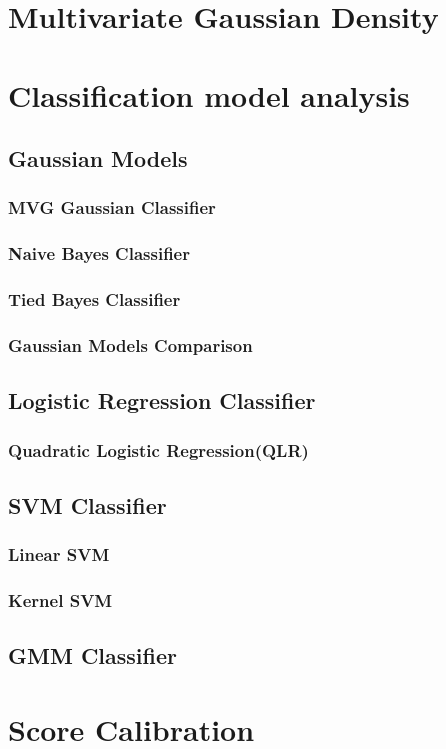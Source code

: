 \documentclass{article}
\begin{document}
\section{Multivariate Gaussian Density}

\section{Classification model analysis}
\subsection{Gaussian Models}
\subsubsection{MVG Gaussian Classifier}
\subsubsection{Naive Bayes Classifier}
\subsubsection{Tied Bayes Classifier}
\subsubsection{Gaussian Models Comparison}
\subsection{Logistic Regression Classifier}
\subsubsection{Quadratic Logistic Regression(QLR)}
\subsection{SVM Classifier}
\subsubsection{Linear SVM}
\subsubsection{Kernel SVM}
\subsection{GMM Classifier}
\section{Score Calibration}
\end{document}
